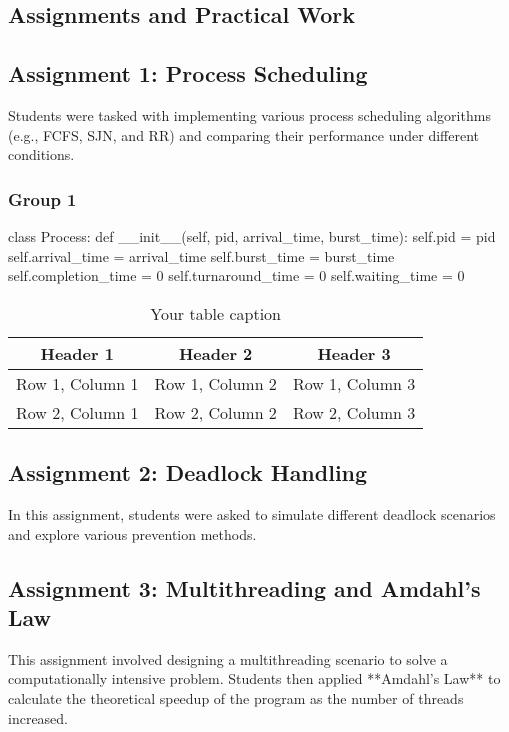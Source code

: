 \documentclass[12pt]{article}
\begin{document}
\begin{itemize}
\section{Assignments and Practical Work}
\subsection{Assignment 1: Process Scheduling}
Students were tasked with implementing various process scheduling algorithms (e.g., FCFS, SJN, and RR) and comparing their performance under different conditions.
\subsubsection{Group 1}
\begin{python}
    class Process:
    def __init__(self, pid, arrival_time, burst_time):
        self.pid = pid
        self.arrival_time = arrival_time
        self.burst_time = burst_time
        self.completion_time = 0
        self.turnaround_time = 0
        self.waiting_time = 0
\end{python}

\begin{table}[htbp] %
    \centering
    \begin{tabular}{|c|c|c|} %
    \hline
    Header 1 & Header 2 & Header 3 \\ %
    \hline
    Row 1, Column 1 & Row 1, Column 2 & Row 1, Column 3 \\ %
    \hline
    Row 2, Column 1 & Row 2, Column 2 & Row 2, Column 3 \\ %
    \hline
    \end{tabular}
    \caption{Your table caption} %
    \label{tab:your_label} %
\end{table}

\subsection{Assignment 2: Deadlock Handling}
In this assignment, students were asked to simulate different deadlock scenarios and explore various prevention methods.

\subsection{Assignment 3: Multithreading and Amdahl's Law}
This assignment involved designing a multithreading scenario to solve a computationally intensive problem. Students then applied **Amdahl's Law** to calculate the theoretical speedup of the program as the number of threads increased.


\end{itemize}
\end{document}
